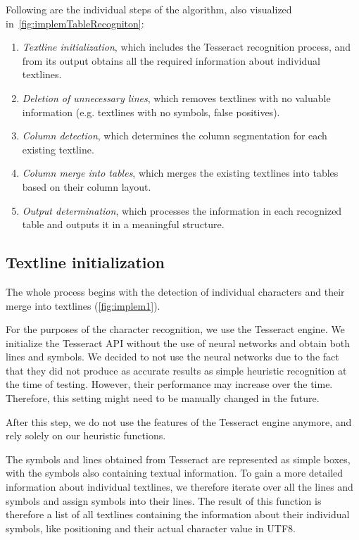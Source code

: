 Following are the individual steps of the algorithm, also visualized in~\cref{fig:implemTableRecogniton}:
\begin{enumerate}
\item \emph{Textline initialization}, which includes the Tesseract recognition process, and from its output obtains all the required information about individual textlines.
\item \emph{Deletion of unnecessary lines}, which removes textlines with no valuable information (e.g. textlines with no symbols, false positives).
\item \emph{Column detection}, which determines the column segmentation for each existing textline.
\item \emph{Column merge into tables}, which merges the existing textlines into tables based on their column layout.
\item \emph{Output determination}, which processes the information in each recognized table and outputs it in a meaningful structure.
\end{enumerate}

\subsection{Textline initialization} \label{textlineInitialization}

The whole process begins with the detection of individual characters and their merge into textlines (\cref{fig:implem1}).

For the purposes of the character recognition, we use the Tesseract engine. We initialize the Tesseract API without the use of neural networks and obtain both lines and symbols. We decided to not use the neural networks due to the fact that they did not produce as accurate results as simple heuristic recognition at the time of testing. However, their performance may increase over the time. Therefore, this setting might need to be manually changed in the future.

After this step, we do not use the features of the Tesseract engine anymore, and rely solely on our heuristic functions.

The symbols and lines obtained from Tesseract are represented as simple boxes, with the symbols also containing textual information. To gain a more detailed information about individual textlines, we therefore iterate over all the lines and symbols and assign symbols into their lines. The result of this function is therefore a list of all textlines containing the information about their individual symbols, like positioning and their actual character value in UTF8.

